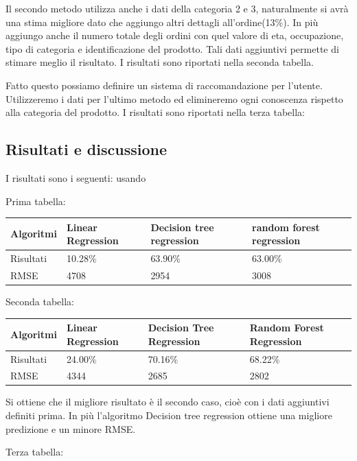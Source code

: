 \documentclass{article}
\begin{document}
Il secondo metodo utilizza anche i dati della categoria 2 e 3, naturalmente si avrà una stima migliore dato che aggiungo altri dettagli all'ordine(13\%). In più aggiungo anche il numero totale degli ordini con quel valore di eta, occupazione, tipo di categoria e identificazione del prodotto. Tali dati aggiuntivi permette di stimare meglio il risultato. I risultati sono riportati nella seconda tabella.


Fatto questo possiamo definire un sistema di raccomandazione per l'utente. Utilizzeremo i dati per l'ultimo metodo ed elimineremo ogni conoscenza rispetto alla categoria del prodotto. I risultati sono riportati nella terza tabella:



\subsection{Risultati e discussione}
I risultati sono i seguenti: usando \cite{scikit-learn}

Prima tabella:

\begin{tabular}{|p{}|p{}|p{}|p{}|}
\hline
Algoritmi &Linear Regression          & Decision tree regression         &random forest regression      \\
\hline
Risultati & 10.28\%            & 63.90\%     & 63.00\%          \\
\hline
RMSE     & 4708     & 2954                & 3008           \\
\hline
\end{tabular}

Seconda tabella:

\begin{tabular}{|p{}|p{}|p{}|p{}|}
\hline
Algoritmi &Linear Regression          & Decision Tree Regression         &Random Forest Regression      \\
\hline
Risultati &24.00\%            & 70.16\%    & 68.22\%          \\
\hline
RMSE &4344 &2685 &2802\\
\hline
\end{tabular}

Si ottiene che il migliore risultato è il secondo caso, cioè con i dati aggiuntivi definiti  prima. In più l'algoritmo  Decision tree regression ottiene una migliore predizione e un minore RMSE.

Terza tabella: 
\end{document}
